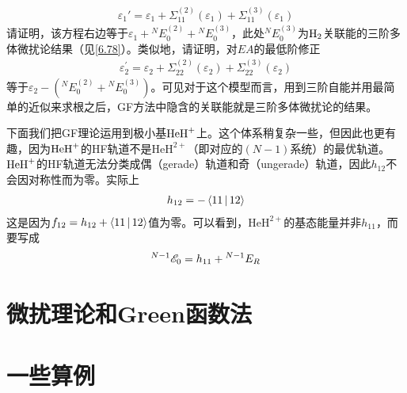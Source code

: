{    \begin{align*}
    \varepsilon_{1}'=\varepsilon_{1}+\Sigma_{11}^{(2)}\left(\varepsilon_{1}\right)+\Sigma_{11}^{(3)}\left(\varepsilon_{1}\right)
    \end{align*}
请证明，该方程右边等于$\varepsilon_{1}+{}^{N}E_{0}^{(2)}+{}^{N} E_{0}^{(3)}$，此处${}^{N}E_{0}^{(3)}$为$\mathrm{H}_2$关联能的三阶多体微扰论结果（见\eqref{6.78}）。类似地，请证明，对$EA$的最低阶修正
    \begin{align*}
    \varepsilon_{2}^{\prime}=\varepsilon_{2}+\Sigma_{22}^{(2)}\left(\varepsilon_{2}\right)+\Sigma_{22}^{(3)}\left(\varepsilon_{2}\right)
    \end{align*}
等于$\varepsilon_{2}-({}^{N} E_{0}^{(2)}+{}^{N} E_{0}^{(3)})$。可见对于这个模型而言，用到三阶自能并用最简单的近似来求根之后，GF方法中隐含的关联能就是三阶多体微扰论的结果。
}

下面我们把GF理论运用到极小基$\mathrm{HeH}^+$上。这个体系稍复杂一些，但因此也更有趣，因为$\mathrm{HeH}^+$的HF轨道不是$\mathrm{HeH}^{2+}$（即对应的$(N-1)$系统）的最优轨道。$\mathrm{HeH}^+$的HF轨道无法分类成偶（gerade）轨道和奇（ungerade）轨道，因此$h_{12}$不会因对称性而为零。实际上
\begin{align}
h_{12} = -\Braket{11|12}
\end{align}
这是因为$f_{12} = h_{12} + \Braket{11|12}$值为零。可以看到，$\mathrm{HeH}^{2+}$的基态能量并非$h_{11}$，而要写成
\begin{align}
{}^{N-1}\mathscr{E}_0 = h_{11} + {}^{N-1}E_R
\end{align}
\section{微扰理论和Green函数法}
\section{一些算例}
\theendnotes